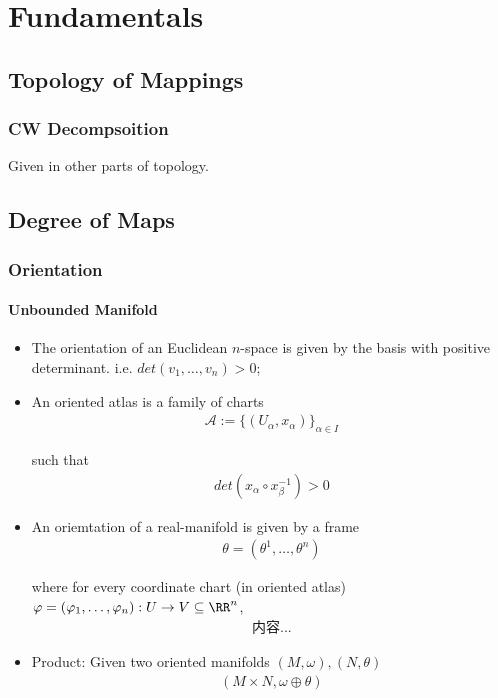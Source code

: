 \documentclass[Total.tex]{subfiles}
\begin{document}
	\chapter{Fundamentals}
		\section{Topology of Mappings}
			\subsection{CW Decompsoition}
				Given in other parts of topology. 
		\section{Degree of Maps}
			\subsection{Orientation}
				\subsubsection{Unbounded Manifold}
				\begin{Def}
					\begin{itemize}
						\item The orientation of an  Euclidean $n$-space is given by the basis with positive determinant. i.e. $det(v_1,\dots,v_n)>0$;
						\item An oriented atlas is a family of charts
						\begin{gather*}
							\mathcal{A}:=\{(U_\alpha,x_\alpha)\}_{\alpha\in I}
						\end{gather*}
						
						such that
						\begin{gather*}
							det(x_\alpha\circ x_\beta^{-1})>0
						\end{gather*}
						\item An oriemtation of a real-manifold is given by a frame
						\begin{gather*}
							\theta=(\theta^1,\dots,\theta^n)
						\end{gather*}
						
						where for every coordinate chart (in oriented atlas) $\varphi=(\varphi_1,\dots,\varphi_n):U\rightarrow V\subseteq \RR^n$, 
						\begin{gather*}
							内容...
						\end{gather*}
						\item Product: Given two oriented manifolds $(M,\omega),(N,\theta)$
						\begin{gather*}
							(
							M\times N,\omega\oplus \theta)
						\end{gather*}
					\end{itemize}
				\end{Def}
				
\end{document}
